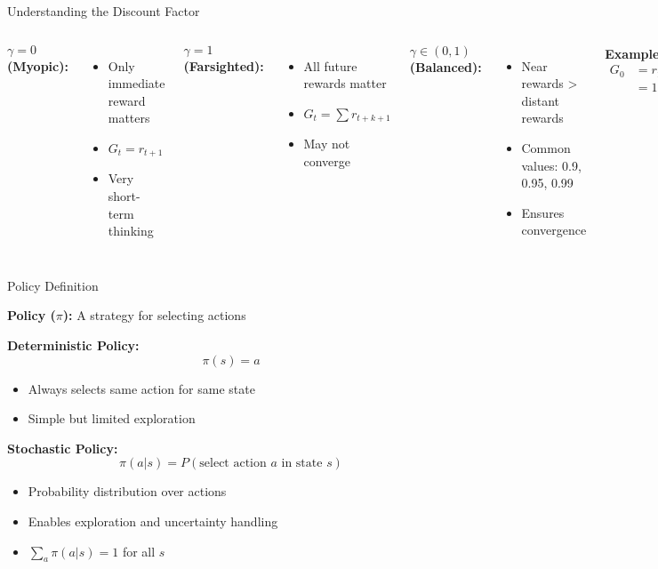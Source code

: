 \documentclass[aspectratio=169,10pt]{beamer}
\begin{document}
\begin{frame}{Understanding the Discount Factor}

\begin{columns}[t]
\textbf{$\gamma = 0$ (Myopic):}
\begin{itemize}
    \item Only immediate reward matters
    \item $G_t = r_{t+1}$
    \item Very short-term thinking
\end{itemize}

\vfill

\textbf{$\gamma = 1$ (Farsighted):}
\begin{itemize}
    \item All future rewards matter
    \item $G_t = \sum r_{t+k+1}$
    \item May not converge
\end{itemize}

\textbf{$\gamma \in (0,1)$ (Balanced):}
\begin{itemize}
    \item Near rewards > distant rewards
    \item Common values: 0.9, 0.95, 0.99
    \item Ensures convergence
\end{itemize}

\vfill

\textbf{Example ($\gamma = 0.9$):}
\begin{align}
G_0 &= r_1 + 0.9 r_2 + 0.81 r_3 + \ldots\\
&= 1 + 0.9 + 0.81 + 0.729 + \ldots
\end{align}
\end{columns}

\end{frame}

\begin{frame}{Policy Definition}

\textbf{Policy ($\pi$):} A strategy for selecting actions

\vfill

\textbf{Deterministic Policy:}
$$\pi(s) = a$$
\begin{itemize}
    \item Always selects same action for same state
    \item Simple but limited exploration
\end{itemize}

\vfill

\textbf{Stochastic Policy:}
$$\pi(a|s) = P(\text{select action } a \text{ in state } s)$$
\begin{itemize}
    \item Probability distribution over actions
    \item Enables exploration and uncertainty handling
    \item $\sum_a \pi(a|s) = 1$ for all $s$
\end{itemize}

\end{frame}
\end{document}
